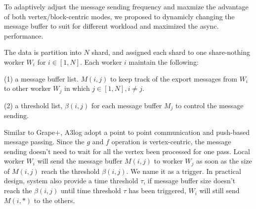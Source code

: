 {	To adaptively adjust the message sending frequency and maxmize the advantage of both vertex/block-centric modes, we proposed to dynamicly changing the message buffer to suit for different workload and maximized the async. performance.
	
	
	The data is partition into $N$ shard, and assigned each shard to one share-nothing worker $W_i$ for $i \in [1,N]$.
	Each worker $i$ maintain the following:
	
	(1) a message buffer list. $M(i,j)$ to keep track of the export messages from $W_i$ to other worker $W_j$ in which $j\in[1,N],i \neq j$.
	
	(2) a threshold list, $\beta(i,j)$ for each message buffer $M_j$ to control the message sending.
	
	 Similar to Grape$+$, A3log adopt a point to point communication and push-based  message passing. Since the $g$ and $f$ operation is vertex-centric, the message sending doesn't need to wait for all the vertex been processed for one pass. Local worker $W_i$ will send the message buffer $M(i,j)$ to worker $W_j$ as soon as the size of $M(i,j)$ reach the threshold $\beta{(i,j)}$. We name it as a trigger. In practical design, system also provide a time threshold $\tau$, if message buffer size doesn't reach the $\beta(i,j)$ until time threshold $\tau$ has been triggered, $W_i$ will still send $M(i,*)$ to the others. 

}
